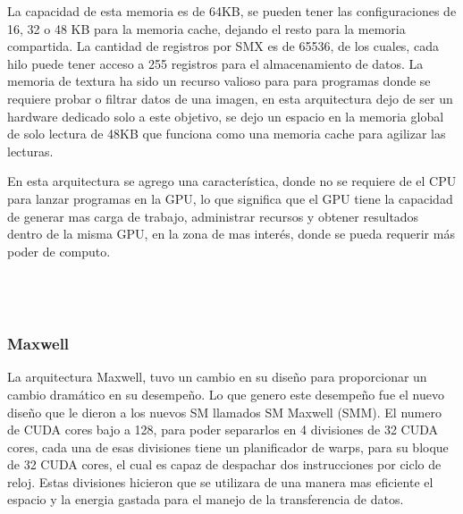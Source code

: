La capacidad de esta memoria es de 64KB, se pueden tener las configuraciones de 16, 32 o 48 KB para la memoria cache, dejando el resto para la memoria compartida. La cantidad de registros por SMX es de 65536, de los cuales, cada hilo puede tener acceso a 255 registros para el almacenamiento de datos. La memoria de textura ha sido un recurso valioso para para programas donde se requiere probar o filtrar datos de una imagen, en esta arquitectura dejo de ser un hardware dedicado solo a este objetivo, se dejo un espacio en la memoria global de solo lectura de 48KB que funciona como una memoria cache para agilizar las lecturas.



En esta arquitectura se agrego una característica, donde no se requiere de el CPU para lanzar programas en la GPU, lo que significa que el GPU tiene la capacidad de generar mas carga de trabajo, administrar recursos y obtener resultados dentro de la misma GPU, en la zona de mas interés, donde se pueda requerir más poder de computo. \\\\\\\\



\subsubsection{Maxwell}
La arquitectura Maxwell\cite{Maxwell}, tuvo un cambio en su diseño para proporcionar un cambio dramático en su desempeño. Lo que genero este desempeño fue el nuevo diseño que le dieron a los nuevos SM llamados SM Maxwell (SMM). El numero de CUDA cores bajo a 128, para poder separarlos en 4 divisiones de 32 CUDA cores, cada una de esas divisiones tiene un planificador de warps, para su bloque de 32 CUDA cores, el cual es capaz de despachar dos instrucciones por ciclo de reloj. Estas divisiones hicieron que se utilizara de una manera mas eficiente el espacio y la energia gastada para el manejo de la transferencia de datos.


